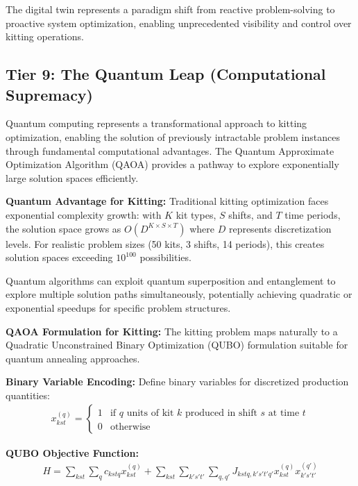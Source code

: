 \documentclass{article}
\begin{document}
The digital twin represents a paradigm shift from reactive problem-solving to proactive system optimization, enabling unprecedented visibility and control over kitting operations.

\subsection{Tier 9: The Quantum Leap (Computational Supremacy)}

Quantum computing represents a transformational approach to kitting optimization, enabling the solution of previously intractable problem instances through fundamental computational advantages. The Quantum Approximate Optimization Algorithm (QAOA) provides a pathway to explore exponentially large solution spaces efficiently.

\textbf{Quantum Advantage for Kitting:}
Traditional kitting optimization faces exponential complexity growth: with $K$ kit types, $S$ shifts, and $T$ time periods, the solution space grows as $O(D^{K \times S \times T})$ where $D$ represents discretization levels. For realistic problem sizes (50 kits, 3 shifts, 14 periods), this creates solution spaces exceeding $10^{100}$ possibilities.

Quantum algorithms can exploit quantum superposition and entanglement to explore multiple solution paths simultaneously, potentially achieving quadratic or exponential speedups for specific problem structures.

\textbf{QAOA Formulation for Kitting:}
The kitting problem maps naturally to a Quadratic Unconstrained Binary Optimization (QUBO) formulation suitable for quantum annealing approaches.

\textbf{Binary Variable Encoding:}
Define binary variables for discretized production quantities:
\begin{align}
x_{kst}^{(q)} = \begin{cases}
1 & \text{if } q \text{ units of kit } k \text{ produced in shift } s \text{ at time } t \\
0 & \text{otherwise}
\end{cases}
\end{align}

\textbf{QUBO Objective Function:}
\begin{align}
H = \sum_{kst} \sum_{q} c_{kstq} x_{kst}^{(q)} + \sum_{kst} \sum_{k's't'} \sum_{q,q'} J_{kstq,k's't'q'} x_{kst}^{(q)} x_{k's't'}^{(q')}
\end{align}
\end{document}
